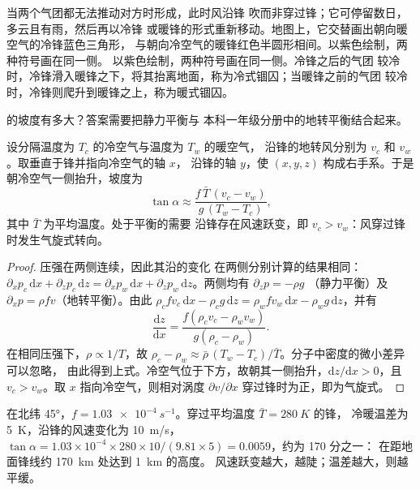 当两个气团都无法推动对方时形成，此时风沿锋
吹而非穿过锋；它可停留数日，多云且有雨，然后再以冷锋
或暖锋的形式重新移动。地图上，它交替画出朝向暖空气的冷锋蓝色三角形，
与朝向冷空气的暖锋红色半圆形相间。以紫色绘制，两种符号画在同一侧。
以紫色绘制，两种符号画在同一侧。冷锋之后的气团
较冷时，冷锋滑入暖锋之下，将其抬离地面，称为冷式锢囚；当暖锋之前的气团
较冷时，冷锋则爬升到暖锋之上，称为暖式锢囚。

的坡度有多大？答案需要把静力平衡与
本科一年级分册中的地转平衡结合起来。

\begin{proposition}[锋面的坡度]\label{prop:b2:weather-systems:slope}
设分隔温度为 $T_c$ 的冷空气与温度为 $T_w$ 的暖空气，
沿锋的地转风分别为 $v_c$ 和 $v_w$。取垂直于锋并指向冷空气的轴 $x$，
沿锋的轴 $y$，使 $(x, y, z)$ 构成右手系。于是
朝冷空气一侧抬升，坡度为
\[
  \tan\alpha \approx \frac{f\,\bar T\,(v_c - v_w)}{g\,(T_w - T_c)},
\]
其中 $\bar T$ 为平均温度。处于平衡的需要
沿锋存在风速跃变，即 $v_c > v_w$：风穿过锋时发生气旋式转向。
\end{proposition}

\begin{proof}
压强在两侧连续，因此其沿的变化
在两侧分别计算的结果相同：$\partial_x p_c\,\mathrm{d}x + \partial_z p_c\,\mathrm{d}z =
\partial_x p_w\,\mathrm{d}x + \partial_z p_w\,\mathrm{d}z$。两侧均有 $\partial_z p = -\rho g$
（静力平衡）及 $\partial_x p = \rho f v$（地转平衡）。由此
$\rho_c f v_c\,\mathrm{d}x - \rho_c g\,\mathrm{d}z = \rho_w f v_w\,\mathrm{d}x - \rho_w
g\,\mathrm{d}z$，并有
\[
  \frac{\mathrm{d}z}{\mathrm{d}x} = \frac{f(\rho_c v_c - \rho_w v_w)}{g(\rho_c - \rho_w)} .
\]
在相同压强下，$\rho \propto 1/T$，故 $\rho_c - \rho_w \approx \bar\rho\,(T_w -
T_c)/\bar T$。分子中密度的微小差异可以忽略，
由此得到上式。冷空气位于下方，故朝其一侧抬升，$\mathrm{d}z/
\mathrm{d}x > 0$，且 $v_c > v_w$。取 $x$ 指向冷空气，则相对涡度
$\partial v/\partial x$ 穿过锋时为正，即为气旋式。
\end{proof}

\begin{example}[典型坡度]\label{ex:b2:weather-systems:slope}
在北纬 \ang{45}，$f = \qty{1.03e-4}{s^{-1}}$。穿过平均温度 $\bar T = \qty{280}{K}$ 的锋，
冷暖温差为 \qty{5}{K}，沿锋的风速变化为 \qty{10}{m/s}，$\tan\alpha
= 1.03 \times 10^{-4} \times 280 \times 10/(9.81 \times 5) = 0.0059$，约为 170 分之一：
在距地面锋线约 \qty{170}{km} 处达到 \qty{1}{km} 的高度。
风速跃变越大，越陡；温差越大，则越平缓。
\end{example}

